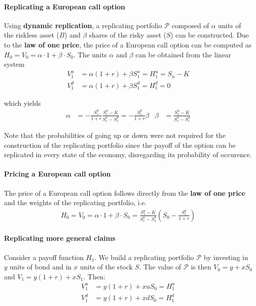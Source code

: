 \documentclass[a4paper,landscape,7pt,fleqn]{scrartcl}
\renewcommand{\emph}[1]{\textbf{#1}}
\begin{document}
\begin{multicols*}{3}
\paragraph{Replicating a European call option}
Using \emph{dynamic replication}, a replicating portfolio $\mathcal{P}$ composed of $\alpha$ units of the riskless asset ($B$) and $\beta$ shares of the risky asset ($S$) can be constructed. Due to the \emph{law of one price}, the price of a European call option can be computed as $H_0 = V_0 = \alpha \cdot 1 + \beta \cdot S_0$. The units $\alpha$ and $\beta$ can be obtained from the linear system
\begin{align*}
V_1^u &= \alpha (1+r) + \beta S_1^u = H_1^u = S_u - K \\
V_1^d &= \alpha (1+r) + \beta S_1^d = H_1^d = 0
\end{align*}

which yields
\begin{align*}
\alpha &= - \frac{S_1^d}{1+r} \frac{S_1^u - K}{S_1^u - S_1^d} = - \frac{S_1^d}{1+r} \beta & \beta &= \frac{S_1^u - K}{S_1^u - S_1^d}
\end{align*}

Note that the probabilities of going up or down were not required for the construction of the replicating portfolio since the payoff of the option can be replicated in every state of the economy, disregarding its probability of occurence.

\paragraph{Pricing a European call option}
The price of a European call option follows directly from the \emph{law of one price} and the weights of the replicating portfolio, i.e.
\begin{align*}
H_0 = V_0 = \alpha \cdot 1 + \beta \cdot S_0 = \frac{S_1^u - K}{S_1^u - S_1^d} \left( S_0 - \frac{S_1^d}{1+r} \right)
\end{align*}

\paragraph{Replicating more general claims}
Consider a payoff function $H_1$. We build a replicating portfolio $\mathcal{P}$ by investing in $y$ units of bond and in $x$ units of the stock $S$. The value of $\mathcal{P}$ is then $V_0 = y + x S_0$ and $V_1 = y (1+r) + x S_1$. Then:
\begin{align*}
V_1^u &= y (1+r) + x u S_0 = H_1^u \\
V_1^d &= y (1+r) + x d S_0 = H_1^d
\end{align*}


\end{multicols*}
\end{document}

